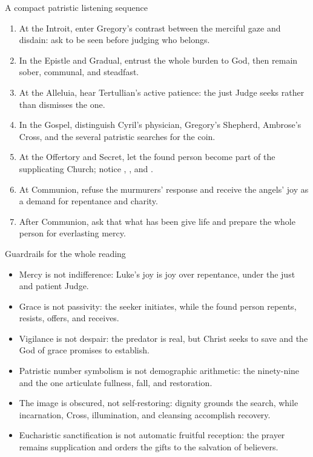 \begin{deepstudy}
\begin{massbox}{A compact patristic listening sequence}
\begin{enumerate}[leftmargin=1.45em,itemsep=0.2em]
\item At the Introit, enter Gregory's contrast between the merciful gaze and disdain: ask to be seen before judging who belongs.
\item In the Epistle and Gradual, entrust the whole burden to God, then remain sober, communal, and steadfast.
\item At the Alleluia, hear Tertullian's active patience: the just Judge seeks rather than dismisses the one.
\item In the Gospel, distinguish Cyril's physician, Gregory's Shepherd, Ambrose's Cross, and the several patristic searches for the coin.
\item At the Offertory and Secret, let the found person become part of the supplicating Church; notice , , and .
\item At Communion, refuse the murmurers' response and receive the angels' joy as a demand for repentance and charity.
\item After Communion, ask that what has been  give life and prepare the whole person for everlasting mercy.
\end{enumerate}
\end{massbox}

\begin{studybox}{Guardrails for the whole reading}
\begin{itemize}
\item Mercy is not indifference: Luke's joy is joy over repentance, under the just and patient Judge.
\item Grace is not passivity: the seeker initiates, while the found person repents, resists, offers, and receives.
\item Vigilance is not despair: the predator is real, but Christ seeks to save and the God of grace promises to establish.
\item Patristic number symbolism is not demographic arithmetic: the ninety-nine and the one articulate fullness, fall, and restoration.
\item The image is obscured, not self-restoring: dignity grounds the search, while incarnation, Cross, illumination, and cleansing accomplish recovery.
\item Eucharistic sanctification is not automatic fruitful reception: the prayer remains supplication and orders the gifts to the salvation of believers.
\end{itemize}
\end{studybox}


\end{deepstudy}
